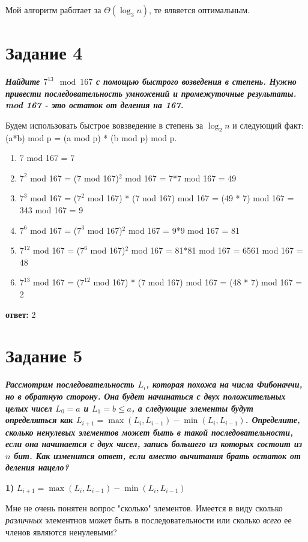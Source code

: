 \documentclass{article}
\begin{document}
Мой алгоритм работает за $\Theta(\log_3 n)$, те ялвяется оптимальным.
 

\section*{\textbf{Задание 4}} \textbf{\textit{Найдите $7^{13} \mod 167$ с помощью быстрого возведения в степень. Нужно привести последовательность умножений и промежуточные результаты. mod 167 - это остаток от деления на 167.}}

Будем использовать быстрое вовзведение в степень за $\log_2 n$ и следующий факт: (a*b) mod p = (a mod p) * (b mod p) mod p.

\begin{enumerate}
    \item 7 mod 167 = 7
    \item $7^2 $ mod 167 = (7 mod 167)$^2$ mod 167 = 7*7 mod 167 = 49
    \item $7^3$ mod 167 = ($7^2$ mod 167) * (7 nod 167) mod 167 = (49 * 7) mod 167 = 343 mod 167 = 9
    \item $7^6$ mod 167 = ($7^3$ mod 167)$^2$ mod 167 = 9*9 mod 167 = 81
    \item $7^{12}$ mod 167 = ($7^6$ mod 167)$^2$ mod 167 = 81*81 mod 167 = 6561 mod 167 = 48
    \item $7^{13}$ mod 167 = ($7^{12}$ mod 167) * (7 mod 167) mod 167 = (48 * 7) mod 167 = 2
\end{enumerate}

\textbf{ответ:} 2 


\section*{\textbf{Задание 5}}  \textbf{\textit{Рассмотрим последовательность $L_i$, которая похожа на числа Фибоначчи, но в обратную сторону. Она будет начинаться с двух положительных целых чисел $L_0 = a$ и $L_1 = b \leq a$, а следующие элементы будут определяться как $L_{i+1} = \max(L_i, L_{i-1}) - \min(L_i, L_{i-1})$. Определите, сколько ненулевых элементов может быть в такой последовательности, если она начинается с двух чисел, запись большего из которых состоит из $n$ бит. Как изменится ответ, если вместо вычитания брать остаток от деления нацело?}}


\textbf{1)} $L_{i+1} = \max(L_i, L_{i-1}) - \min(L_i, L_{i-1})$

Мне не очень понятен вопрос "сколько" элементов. Имеется в виду сколько \textit{различных} элементнов может быть в последовательности или сколько \textit{всего} ее членов являются ненулевыми?
\end{document}
